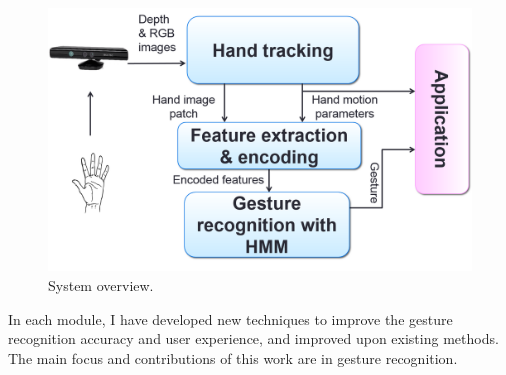 \begin{figure}[tbh]
\centering
\includegraphics[width=0.7\linewidth]{figures/system_overview.png}
\caption{System overview.}
\label{fig:overview}
\end{figure}

In each module, I have developed new
techniques to improve the gesture recognition accuracy and user experience, and
improved upon existing methods.
The main focus and contributions of this work are in gesture recognition.

